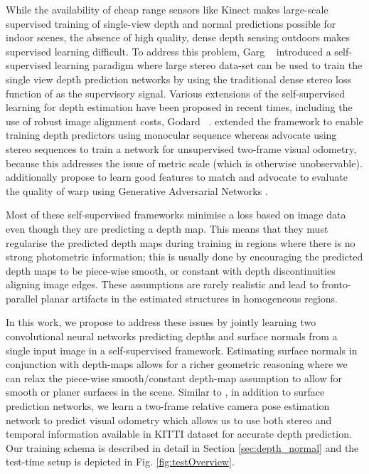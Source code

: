 \documentclass[letterpaper, 10 pt, conference]{ieeeconf}
\begin{document}
While the availability of cheap range sensors like Kinect makes large-scale supervised training of single-view depth and normal predictions possible for indoor scenes, the absence of high quality, dense depth sensing outdoors makes supervised learning difficult. To address this problem, Garg \etal~\cite{garg2016depth} introduced a self-supervised learning paradigm where large stereo data-set can be used to train the single view depth prediction networks by using the traditional dense stereo loss function of \cite{horn1981determining} as the supervisory signal. Various extensions of the self-supervised learning for depth estimation have been proposed in recent times, including the use of robust image alignment costs, Godard \etal~\cite{godard2016depth}. \cite{zhou2017sfmlearner} extended the framework to enable training depth predictors using monocular sequence whereas \cite{li2017undeepvo, zhan2018depthVO} advocate using stereo sequences to train a network for unsupervised two-frame visual odometry, because this addresses the issue of metric scale (which is otherwise unobservable). \cite{zhan2018depthVO} additionally propose to learn good features to match and \cite{aleottigenerative} advocate to evaluate the quality of warp using Generative Adversarial Networks \cite{goodfellow2014generative}. 

Most of these self-supervised frameworks minimise a loss based on image data even though they are predicting a depth map.  This means that they must regularise the predicted depth maps during training in regions where there is no strong photometric information; this is usually done by encouraging the predicted depth maps to be piece-wise smooth, or constant with depth discontinuities aligning image edges. These assumptions are rarely realistic and lead to fronto-parallel planar artifacts in the estimated structures in homogeneous regions.

In this work, we propose to address these issues by jointly learning two convolutional neural networks predicting depths and surface normals from a single input image in a self-supervised framework. Estimating surface normals in conjunction with depth-maps allows for a richer geometric reasoning where we can relax the piece-wise smooth/constant depth-map assumption to allow for smooth or planer surfaces in the scene. Similar to \cite{li2017undeepvo,zhan2018depthVO}, in addition to surface prediction networks, we learn a two-frame relative camera pose estimation network to predict visual odometry which allows us to use both stereo and temporal information available in KITTI dataset for accurate depth prediction. Our training schema is described in detail in Section \ref{sec:depth_normal} and the test-time setup is depicted in Fig. \ref{fig:testOverview}.
\end{document}
